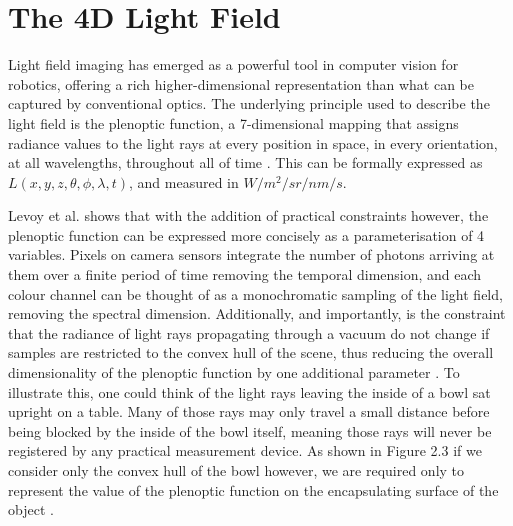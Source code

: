 \section{The 4D Light Field}
Light field imaging has emerged as a powerful tool in computer vision for robotics, offering a rich higher-dimensional representation than what can be captured by conventional optics. The underlying principle used to describe the light field is the plenoptic function, a 7-dimensional mapping that assigns radiance values to the light rays at every position in space, in every orientation, at all wavelengths, throughout all of time \cite{adelson1991plenoptic}. This can be formally expressed as $L(x,y,z,\theta, \phi, \lambda, t)$, and measured in $W/m^2/sr/nm/s$. 


Levoy et al. \cite{levoy1996lfrendering} shows that with the addition of practical constraints however, the plenoptic function can be expressed more concisely as a parameterisation of 4 variables. Pixels on camera sensors integrate the number of photons arriving at them over a finite period of time removing the temporal dimension, and each colour channel can be thought of as a monochromatic sampling of the light field, removing the spectral dimension. Additionally, and importantly, is the constraint that the radiance of light rays propagating through a vacuum do not change if samples are restricted to the convex hull of the scene, thus reducing the overall dimensionality of the plenoptic function by one additional parameter \cite{levoy1996lfrendering}. To illustrate this, one could think of the light rays leaving the inside of a bowl sat upright on a table. Many of those rays may only travel a small distance before being blocked by the inside of the bowl itself, meaning those rays will never be registered by any practical measurement device. As shown in Figure 2.3 if we consider only the convex hull of the bowl however, we are required only to represent the value of the plenoptic function on the encapsulating surface of the object \cite{gortler1996lumigraph}.

